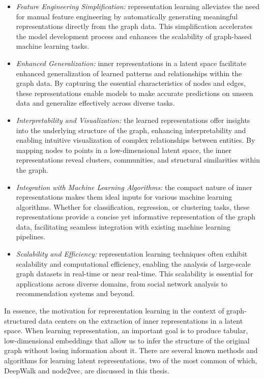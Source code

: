 \begin{itemize}

    \item \emph{Feature Engineering Simplification:} representation learning alleviates the need for manual feature engineering by automatically generating meaningful representations directly from the graph data. This simplification accelerates the model development process and enhances the scalability of graph-based machine learning tasks.

    \item \emph{Enhanced Generalization:} inner representations in a latent space facilitate enhanced generalization of learned patterns and relationships within the graph data. By capturing the essential characteristics of nodes and edges, these representations enable models to make accurate predictions on unseen data and generalize effectively across diverse tasks.

    \item \emph{Interpretability and Visualization:} the learned representations offer insights into the underlying structure of the graph, enhancing interpretability and enabling intuitive visualization of complex relationships between entities. By mapping nodes to points in a low-dimensional latent space, the inner representations reveal clusters, communities, and structural similarities within the graph.

    \item \emph{Integration with Machine Learning Algorithms:} the compact nature of inner representations makes them ideal inputs for various machine learning algorithms. Whether for classification, regression, or clustering tasks, these representations provide a concise yet informative representation of the graph data, facilitating seamless integration with existing machine learning pipelines.

    \item \emph{Scalability and Efficiency:} representation learning techniques often exhibit scalability and computational efficiency, enabling the analysis of large-scale graph datasets in real-time or near real-time. This scalability is essential for applications across diverse domains, from social network analysis to recommendation systems and beyond.

\end{itemize}

In essence, the motivation for representation learning in the context of graph-structured data centers on the extraction of inner representations in a latent space. When learning representation, an important goal is to produce tabular, low-dimensional embeddings that allow us to infer the structure of the original graph without losing information about it. There are several known methods and algorithms for learning latent representations, two of the most common of which, DeepWalk and node2vec, are discussed in this thesis.

